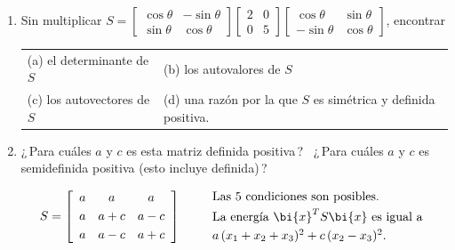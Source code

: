 \begin{enumerate}
\item Sin multiplicar $S={\begin{bmatrix}
      \cos\theta & -\sin\theta\\ \sin\theta & \cos\theta\end{bmatrix}}
  {\begin{bmatrix} 2&0\\ 0&5\end{bmatrix}}
  {\begin{bmatrix} \cos\theta &
      \sin\theta\\  -\sin\theta & \cos\theta
    \end{bmatrix}}$,\; encontrar

\vspace{-9pt}
\begin{table}[h]
\begin{tabular}{ll}
(a) el determinante de $S$ & (b) los autovalores de $S$ \\ 
(c) los autovectores de $S$ & (d) una razón por la que $S$ es simétrica y definida positiva. \\
\end{tabular}
\end{table}

\item ¿\,Para cuáles $a$ y $c$ es esta matriz definida positiva\,? \, ¿\,Para cuáles $a$ y $c$ es semidefinida positiva (esto incluye definida)\,?

\vspace{-5pt}
$$
S=\left[\begin{array}{ccc}
a&a&a\\[3pt] a&a+c&a-c\\[3pt] a&a-c&a+c\\
\end{array}\right]\qquad \begin{array}{l}
\text{Las 5 condiciones son posibles.}\\[3pt]
\text{La energía } \bi{x}^T S\bi{x} \text{ es igual a}\\[3pt]
a\,(x_1+x_2+x_3)^2+c\,(x_2-x_3)^2.\\
\end{array}
$$

\end{enumerate}



